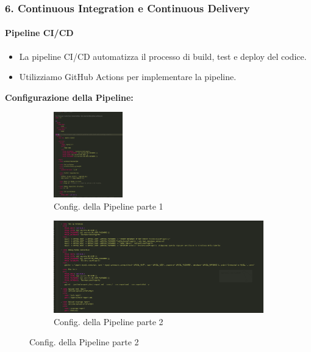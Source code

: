 \documentclass{beamer}
\begin{document}
\begin{frame}[fragile]
\frametitle{6. Continuous Integration e Continuous Delivery}
\framesubtitle{Pipeline CI/CD}

\begin{itemize}
\item La pipeline CI/CD automatizza il processo di build, test e deploy del codice.
\item Utilizziamo GitHub Actions per implementare la pipeline.
\end{itemize}

\textbf{Configurazione della Pipeline:}

\begin{figure}[h!]
    \centering
    \begin{subfigure}[b]{0.45\textwidth}
        \centering
        \includegraphics[width=3cm]{img1.png}
        \caption{Config. della Pipeline parte 1}
    \end{subfigure}
    \hfill
    \begin{subfigure}[b]{0.45\textwidth}
        \centering
        \includegraphics[width=\textwidth]{img2.png}
        \caption{Config. della Pipeline parte 2}

    \end{subfigure}
\end{figure}
\end{frame}
\end{document}

